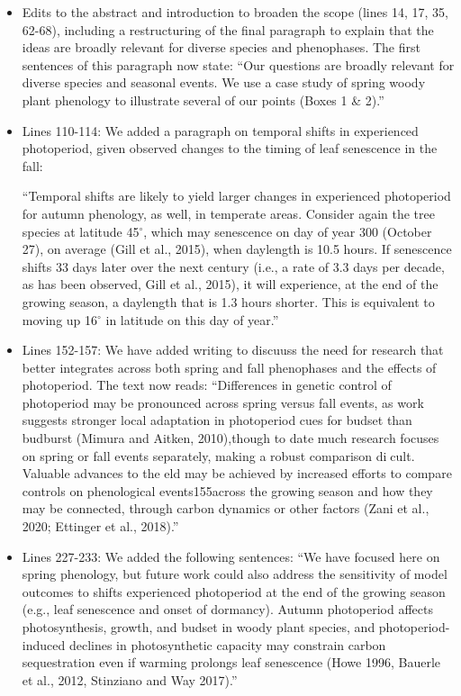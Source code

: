 \documentclass{article}
\begin{document}
\begin{itemize}
\item Edits to the abstract and introduction to broaden the scope (lines 14, 17, 35,  62-68), including a restructuring of the final paragraph to explain that the ideas are broadly relevant for diverse species and phenophases. The first sentences of this paragraph now state: ``Our questions are broadly relevant for diverse species and seasonal events. We use a case study of spring woody plant phenology to illustrate several of our points (Boxes 1 \& 2).''  
\item Lines 110-114: We added a paragraph on temporal shifts in experienced photoperiod, given observed changes to the timing of leaf senescence in the fall: 
\par ``Temporal shifts are likely to yield larger changes in experienced photoperiod for autumn phenology, as well, in temperate areas. Consider again the tree species at latitude 45$^{\circ}$, which may senescence on day of year 300 (October 27), on average (Gill et al., 2015), when daylength is 10.5 hours. If senescence shifts 33 days later over the next century (i.e., a rate of 3.3 days per decade, as has been observed, Gill et al., 2015), it will experience, at the end of the growing season, a daylength that is 1.3 hours shorter. This is equivalent to moving up 16$^{\circ}$ in latitude on this day of year.''
\item Lines 152-157: We have added writing to discuuss the need for research that better integrates across both spring and fall phenophases and the effects of photoperiod. The text now reads: ``Differences in genetic control of photoperiod may be pronounced across spring versus fall events,  as work suggests stronger local adaptation in photoperiod cues for budset than budburst (Mimura and Aitken, 2010),though to date much research focuses on spring or fall events separately, making a robust comparison dicult. Valuable advances to the  eld may be achieved by increased efforts to compare controls on phenological events155across the growing season and how they may be connected, through carbon dynamics or other factors (Zani et al., 2020; Ettinger et al., 2018).'' 
\item Lines 227-233: We added the following sentences: ``We have focused here on spring phenology, but future work could also address the sensitivity of model outcomes to shifts experienced photoperiod at the end of the growing season (e.g., leaf senescence and onset of dormancy). Autumn photoperiod affects photosynthesis, growth, and budset in woody plant species, and photoperiod-induced declines in photosynthetic capacity may constrain carbon sequestration even if warming prolongs leaf senescence (Howe 1996, Bauerle et al., 2012, Stinziano and Way 2017).''


\end{itemize}
\end{document}
